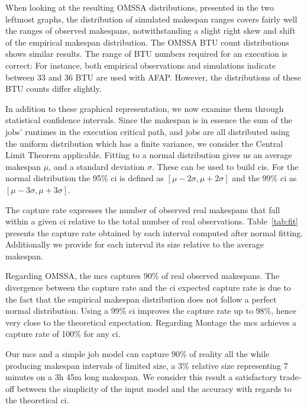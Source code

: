 \documentclass[10pt,conference,compsocconf]{IEEEtran}
\begin{document}
When looking at the resulting OMSSA distributions, presented in the two leftmost
graphs,  the distribution  of simulated  makespan ranges  covers fairly  well the
ranges of  observed makespans, notwithstanding a  slight right skew and  shift of
the empirical  makespan distribution.  The  OMSSA BTU count  distributions shows
similar results.  The range of BTU  numbers required for an execution is correct:
For instance,  both empirical  observations  and simulations  indicate
between  33 and  36 BTU  are used with AFAP. However, the  distributions of  these BTU  counts
differ slightly.


In addition to these graphical representation,  we  now examine  them  through
statistical confidence intervals.   Since the makespan is in essence  the sum of %
the jobs' runtimes  in the  execution critical path,  and jobs  are all
distributed  using the  uniform distribution  which  has a  finite variance,  we
consider the Central Limit Theorem applicable.  Fitting to a normal distribution %
gives us an average makespan $\mu{}$, and a standard deviation $\sigma{}$. These
can be used to  build \acp{ci}. For the normal distribution  the 95\% \ac{ci} is
defined  as   $[\mu{}-2\sigma{},\mu{}+2\sigma{}]$  and   the  99\%   \ac{ci}  as
$[\mu{}-3\sigma{},\mu{}+3\sigma{}]$.

The capture rate expresses the number of observed real makespans that fall
within a given \ac{ci} relative to the total number of real observations.
Table~\ref{tab:fit} presents the capture rate obtained by each interval computed
after normal fitting.  Additionally we provide for each interval its size
relative to the average makespan.

Regarding OMSSA, the  \ac{mcs} captures 90\% of real observed  makespans. The divergence
between the  capture rate and  the \ac{ci} expected capture  rate is due  to the
fact that the  empirical makespan distribution does not follow  a perfect normal
distribution. Using  a 99\% \ac{ci}  improves the capture  rate up to  98\%,
hence very close  to the theoretical expectation. Regarding Montage  the
\ac{mcs} achieves a capture rate of 100\% for any \ac{ci}.


Our \ac{mcs} and a simple job model can capture 90\% of reality all the while
producing makespan intervals of limited size, a 3\% relative size representing 7
minutes on a 3h 45m long makespan. We consider this result a satisfactory
trade-off between the simplicity of the input model and the accuracy with
regards to the theoretical \ac{ci}.
\end{document}
